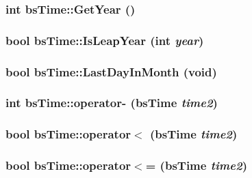 \label{classbs_time_a3573b9448deb1114eb32070d3c179cee}
\hypertarget{classbs_time_afcb5953580c085bce20eb33a4b21e155}{
\subsubsection[{GetYear}]{\setlength{\rightskip}{0pt plus 5cm}int bsTime::GetYear ()}}
\label{classbs_time_afcb5953580c085bce20eb33a4b21e155}
\hypertarget{classbs_time_a0f580ba0f0255ced05439c50049529d6}{
\subsubsection[{IsLeapYear}]{\setlength{\rightskip}{0pt plus 5cm}bool bsTime::IsLeapYear (int {\em year})}}
\label{classbs_time_a0f580ba0f0255ced05439c50049529d6}
\hypertarget{classbs_time_a4e1e8ac2838d301c1d019731ace417fb}{
\subsubsection[{LastDayInMonth}]{\setlength{\rightskip}{0pt plus 5cm}bool bsTime::LastDayInMonth (void)}}
\label{classbs_time_a4e1e8ac2838d301c1d019731ace417fb}
\hypertarget{classbs_time_a87d7d9145aa5c21890dea28db22dba7d}{
\subsubsection[{operator-\/}]{\setlength{\rightskip}{0pt plus 5cm}int bsTime::operator-\/ ({\bf bsTime} {\em time2})}}
\label{classbs_time_a87d7d9145aa5c21890dea28db22dba7d}
\hypertarget{classbs_time_a356f925ea169ae5a7a6057a4f132888e}{
\subsubsection[{operator$<$}]{\setlength{\rightskip}{0pt plus 5cm}bool bsTime::operator$<$ ({\bf bsTime} {\em time2})}}
\label{classbs_time_a356f925ea169ae5a7a6057a4f132888e}
\hypertarget{classbs_time_ab76bf8c42eef5e941421b502783784ea}{
\subsubsection[{operator$<$=}]{\setlength{\rightskip}{0pt plus 5cm}bool bsTime::operator$<$= ({\bf bsTime} {\em time2})}}
